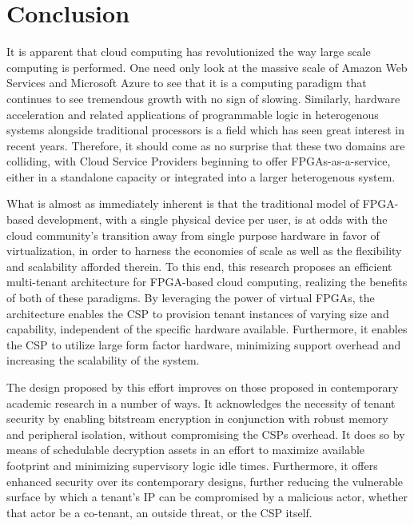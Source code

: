 
\chapter{Conclusion}\label{ch:conclusion}
It is apparent that cloud computing has revolutionized the way large scale computing is performed. One need only look at the massive scale of Amazon Web Services and Microsoft Azure to see that it is a computing paradigm that continues to see tremendous growth with no sign of slowing. Similarly, hardware acceleration and related applications of programmable logic in heterogenous systems alongside traditional processors is a field which has seen great interest in recent years. Therefore, it should come as no surprise that these two domains are colliding, with Cloud Service Providers beginning to offer FPGAs-as-a-service, either in a standalone capacity or integrated into a larger heterogenous system.

What is almost as immediately inherent is that the traditional model of FPGA-based development, with a single physical device per user, is at odds with the cloud community's transition away from single purpose hardware in favor of virtualization, in order to harness the economies of scale as well as the flexibility and scalability afforded therein. To this end, this research proposes an efficient multi-tenant architecture for FPGA-based cloud computing, realizing the benefits of both of these paradigms. By leveraging the power of virtual FPGAs, the architecture enables the CSP to provision tenant instances of varying size and capability, independent of the specific hardware available. Furthermore, it enables the CSP to utilize large form factor hardware, minimizing support overhead and increasing the scalability of the system.

The design proposed by this effort improves on those proposed in contemporary academic research in a number of ways. It acknowledges the necessity of tenant security by enabling bitstream encryption in conjunction with robust memory and peripheral isolation, without compromising the CSPs overhead. It does so by means of schedulable decryption assets in an effort to maximize available footprint and minimizing supervisory logic idle times. Furthermore, it offers enhanced security over its contemporary designs, further reducing the vulnerable surface by which a tenant's IP can be compromised by a malicious actor, whether that actor be a co-tenant, an outside threat, or the CSP itself.

